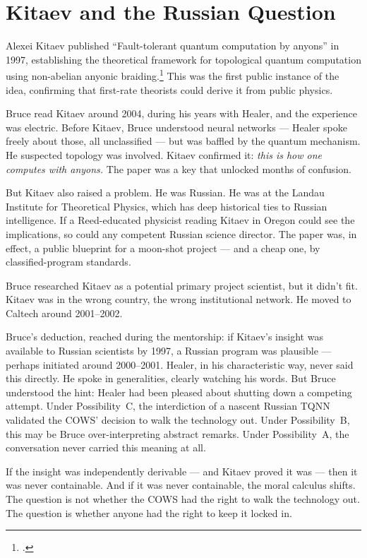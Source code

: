 \section*{Kitaev and the Russian Question}
\label{pos10:kitaev-and-the-russian-question}

Alexei Kitaev published ``Fault-tolerant quantum computation by anyons'' in 1997, establishing the theoretical framework for topological quantum computation using non-abelian anyonic braiding.\footcite{kitaev2003} This was the first public instance of the idea, confirming that first-rate theorists could derive it from public physics.

Bruce read Kitaev around 2004, during his years with Healer, and the experience was electric. Before Kitaev, Bruce understood neural networks --- Healer spoke freely about those, all unclassified --- but was baffled by the quantum mechanism. He suspected topology was involved. Kitaev confirmed it: \textit{this is how one computes with anyons.} The paper was a key that unlocked months of confusion.

But Kitaev also raised a problem. He was Russian. He was at the Landau Institute for Theoretical Physics, which has deep historical ties to Russian intelligence. If a Reed-educated physicist reading Kitaev in Oregon could see the implications, so could any competent Russian science director. The paper was, in effect, a public blueprint for a moon-shot project --- and a cheap one, by classified-program standards.

Bruce researched Kitaev as a potential primary project scientist, but it didn't fit. Kitaev was in the wrong country, the wrong institutional network. He moved to Caltech around 2001--2002.

Bruce's deduction, reached during the mentorship: if Kitaev's insight was available to Russian scientists by 1997, a Russian program was plausible --- perhaps initiated around 2000--2001. Healer, in his characteristic way, never said this directly. He spoke in generalities, clearly watching his words. But Bruce understood the hint: Healer had been pleased about shutting down a competing attempt. Under Possibility~C, the interdiction of a nascent Russian TQNN validated the COWS' decision to walk the technology out. Under Possibility~B, this may be Bruce over-interpreting abstract remarks. Under Possibility~A, the conversation never carried this meaning at all.

If the insight was independently derivable --- and Kitaev proved it was --- then it was never containable. And if it was never containable, the moral calculus shifts. The question is not whether the COWS had the right to walk the technology out. The question is whether anyone had the right to keep it locked in.


